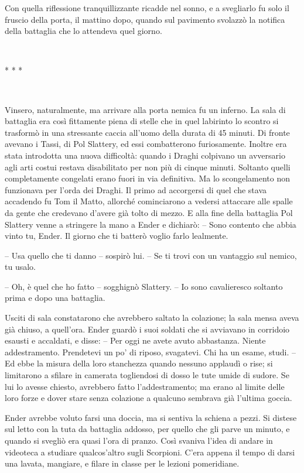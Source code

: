 {Con quella riflessione tranquillizzante ricadde nel sonno, e a
	svegliarlo fu solo il fruscio della porta, il mattino dopo, quando sul
	pavimento svolazzò la notifica della battaglia che lo attendeva quel
	giorno.}

{~}

\begin{center}
	{* * *}
\end{center}

{~}

{Vinsero, naturalmente, ma arrivare alla porta nemica fu un inferno. La
	sala di battaglia era così fittamente piena di stelle che in quel
	labirinto lo scontro si trasformò in una stressante caccia all'uomo
	della durata di 45 minuti. Di fronte avevano i Tassi, di Pol Slattery,
	ed essi combatterono furiosamente. Inoltre era stata introdotta una
	nuova difficoltà: quando i Draghi colpivano un avversario agli arti
	costui restava disabilitato per non più di cinque minuti. Soltanto
	quelli completamente congelati erano fuori in via definitiva. Ma lo
	scongelamento non funzionava per l'orda dei Draghi. Il primo ad
	accorgersi di quel che stava accadendo fu Tom il Matto, allorché
	cominciarono a vedersi attaccare alle spalle da gente che credevano
	d'avere già tolto di mezzo. E alla fine della battaglia Pol Slattery
	venne a stringere la mano a Ender e dichiarò: -- Sono contento che abbia
	vinto tu, Ender. Il giorno che ti batterò voglio farlo lealmente.}

{-- Usa quello che ti danno -- sospirò lui. -- Se ti trovi con un
	vantaggio sul nemico, tu usalo.}

{-- Oh, è quel che ho fatto -- sogghignò Slattery. -- Io sono
	cavalieresco soltanto prima e dopo una battaglia.}

{Usciti di sala constatarono che avrebbero saltato la colazione; la sala
	mensa aveva già chiuso, a quell'ora. Ender guardò i suoi soldati che si
	avviavano in corridoio esausti e accaldati, e disse: -- Per oggi ne
	avete avuto abbastanza. Niente addestramento. Prendetevi un po' di
	riposo, svagatevi. Chi ha un esame, studi. -- Ed ebbe la misura della
	loro stanchezza quando nessuno applaudì o rise; si limitarono a sfilare
	in camerata togliendosi di dosso le tute umide di sudore. Se lui lo
	avesse chiesto, avrebbero fatto l'addestramento; ma erano al limite
	delle loro forze e dover stare senza colazione a qualcuno sembrava già
	l'ultima goccia.}

{Ender avrebbe voluto farsi una doccia, ma si sentiva la schiena a
	pezzi. Si distese sul letto con la tuta da battaglia addosso, per quello
	che gli parve un minuto, e quando si svegliò era quasi l'ora di pranzo.
	Così svaniva l'idea di andare in videoteca a studiare qualcos'altro
	sugli Scorpioni. C'era appena il tempo di darsi una lavata, mangiare, e
	filare in classe per le lezioni pomeridiane.}

